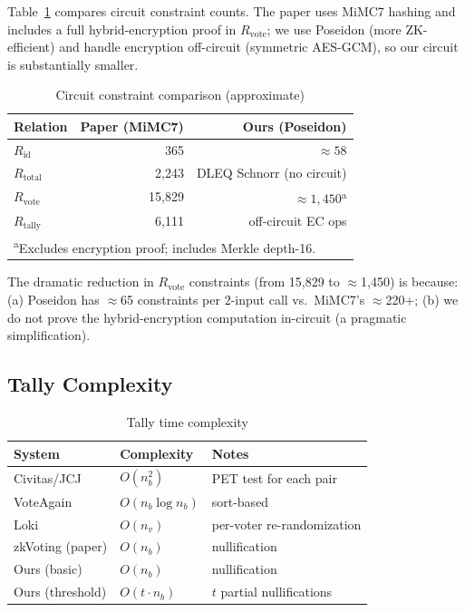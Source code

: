 \documentclass[conference]{IEEEtran}
\begin{document}
Table~\ref{tab:constraints} compares circuit constraint counts.  The paper
uses MiMC7 hashing and includes a full hybrid-encryption proof in
$R_{\text{vote}}$; we use Poseidon (more ZK-efficient) and handle encryption
off-circuit (symmetric AES-GCM), so our circuit is substantially smaller.

\begin{table}[h]
\centering
\caption{Circuit constraint comparison (approximate)}
\label{tab:constraints}
\renewcommand{\arraystretch}{1.15}
\begin{tabular}{lrr}
\toprule
\textbf{Relation} & \textbf{Paper (MiMC7)} & \textbf{Ours (Poseidon)} \\
\midrule
$R_{\text{id}}$              & 365       & $\approx 58$ \\
$R_{\text{total}}$           & 2{,}243   & DLEQ Schnorr (no circuit) \\
$R_{\text{vote}}$            & 15{,}829  & $\approx 1{,}450$\textsuperscript{a} \\
$R_{\text{tally}}$           & 6{,}111   & off-circuit EC ops \\
\bottomrule
\multicolumn{3}{l}{\small \textsuperscript{a}Excludes encryption proof; includes Merkle depth-16.}
\end{tabular}
\end{table}

\noindent The dramatic reduction in $R_{\text{vote}}$ constraints (from 15,829
to $\approx$1,450) is because: (a) Poseidon has $\approx$65 constraints
per 2-input call vs.\ MiMC7's $\approx$220+; (b) we do not prove the
hybrid-encryption computation in-circuit (a pragmatic simplification).

\subsection{Tally Complexity}

\begin{table}[h]
\centering
\caption{Tally time complexity}
\label{tab:tally}
\renewcommand{\arraystretch}{1.15}
\begin{tabular}{lll}
\toprule
\textbf{System} & \textbf{Complexity} & \textbf{Notes} \\
\midrule
Civitas/JCJ     & $O(n_b^2)$ & PET test for each pair \\
VoteAgain       & $O(n_b \log n_b)$ & sort-based \\
Loki            & $O(n_v)$ & per-voter re-randomization \\
zkVoting (paper) & $O(n_b)$ & nullification \\
Ours (basic)    & $O(n_b)$ & nullification \\
Ours (threshold) & $O(t\cdot n_b)$ & $t$ partial nullifications \\
\bottomrule
\end{tabular}
\end{table}
\end{document}
